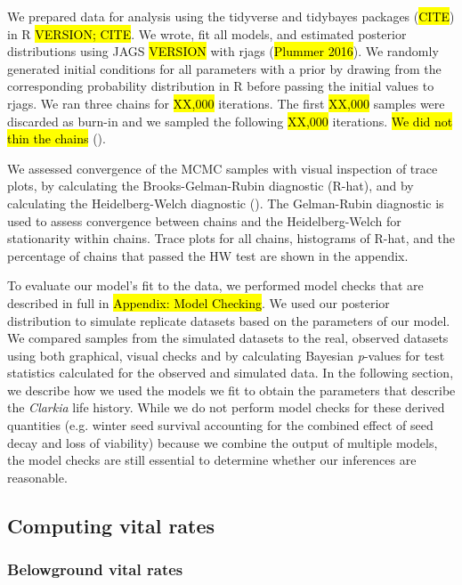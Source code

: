 \documentclass[12pt, oneside, titlepage]{article}   	%
\begin{document}
{We prepared data for analysis using the tidyverse and tidybayes packages (\hl{CITE}) in R \hl{VERSION; CITE}. We wrote, fit all models, and estimated posterior distributions using JAGS \hl{VERSION} with rjags (\hl{Plummer 2016}). We randomly generated initial conditions for all parameters with a prior by drawing from the corresponding probability distribution in R before passing the initial values to rjags. We ran three chains for \hl{XX,000} iterations. The first \hl{XX,000} samples were discarded as burn-in and we sampled the following \hl{XX,000} iterations. \hl{We did not thin the chains} (\cite{elderd2015}).

We assessed convergence of the MCMC samples with visual inspection of trace plots, by calculating the Brooks-Gelman-Rubin diagnostic (R-hat), and by calculating the Heidelberg-Welch diagnostic (\cite{elderd2015}). The Gelman-Rubin diagnostic is used to assess convergence between chains and the Heidelberg-Welch for stationarity within chains. Trace plots for all chains, histograms of R-hat, and the percentage of chains that passed the HW test are shown in the appendix. 
 
To evaluate our model's fit to the data, we performed model checks that are described in full in \hl{Appendix: Model Checking}. We used our posterior distribution to simulate replicate datasets based on the parameters of our model. We compared samples from the simulated datasets to the real, observed datasets using both graphical, visual checks and by calculating Bayesian \textit{p}-values for test statistics calculated for the observed and simulated data. In the following section, we describe how we used the models we fit to obtain the parameters that describe the \textit{Clarkia} life history. While we do not perform model checks for these derived quantities (e.g. winter seed survival accounting for the combined effect of seed decay and loss of viability) because we combine the output of multiple models, the model checks are still essential to determine whether our inferences are reasonable.

\subsection{Computing vital rates}

\subsubsection{Belowground vital rates}

}
\end{document}
